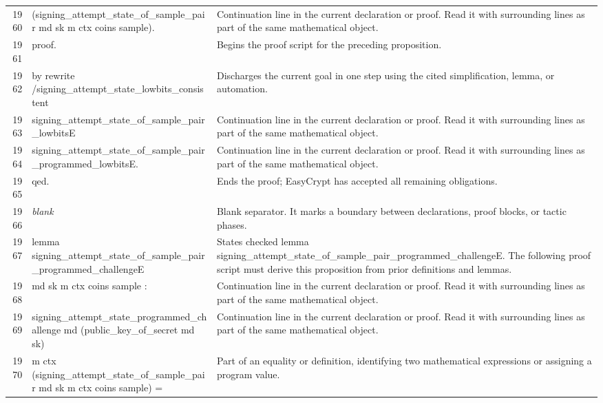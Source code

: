 \documentclass[10pt]{article}
\begin{document}
\begin{longtable}{r L{0.53\textwidth} L{0.37\textwidth}}
1960 & {\ttfamily\scriptsize     (signing\_attempt\_state\_of\_sample\_pair md sk m ctx coins sample).} & Continuation line in the current declaration or proof.  Read it with surrounding lines as part of the same mathematical object. \\
1961 & {\ttfamily\scriptsize proof.} & Begins the proof script for the preceding proposition. \\
1962 & {\ttfamily\scriptsize by rewrite /signing\_attempt\_state\_lowbits\_consistent} & Discharges the current goal in one step using the cited simplification, lemma, or automation. \\
1963 & {\ttfamily\scriptsize            signing\_attempt\_state\_of\_sample\_pair\_lowbitsE} & Continuation line in the current declaration or proof.  Read it with surrounding lines as part of the same mathematical object. \\
1964 & {\ttfamily\scriptsize            signing\_attempt\_state\_of\_sample\_pair\_programmed\_lowbitsE.} & Continuation line in the current declaration or proof.  Read it with surrounding lines as part of the same mathematical object. \\
1965 & {\ttfamily\scriptsize qed.} & Ends the proof; EasyCrypt has accepted all remaining obligations. \\
1966 & {\ttfamily\scriptsize \emph{blank}} & Blank separator.  It marks a boundary between declarations, proof blocks, or tactic phases. \\
1967 & {\ttfamily\scriptsize lemma signing\_attempt\_state\_of\_sample\_pair\_programmed\_challengeE} & States checked lemma signing\_attempt\_state\_of\_sample\_pair\_programmed\_challengeE.  The following proof script must derive this proposition from prior definitions and lemmas. \\
1968 & {\ttfamily\scriptsize    md sk m ctx coins sample :} & Continuation line in the current declaration or proof.  Read it with surrounding lines as part of the same mathematical object. \\
1969 & {\ttfamily\scriptsize   signing\_attempt\_state\_programmed\_challenge md (public\_key\_of\_secret md sk)} & Continuation line in the current declaration or proof.  Read it with surrounding lines as part of the same mathematical object. \\
1970 & {\ttfamily\scriptsize     m ctx (signing\_attempt\_state\_of\_sample\_pair md sk m ctx coins sample) =} & Part of an equality or definition, identifying two mathematical expressions or assigning a program value. \\

\end{longtable}
\end{document}

